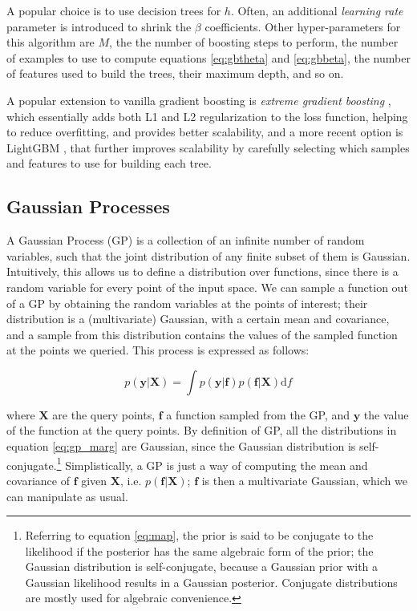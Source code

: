 \documentclass[a4paper,11pt]{kth-mag}
\begin{document}
A popular choice is to use decision trees for $h$. Often, an additional \emph{learning rate} parameter is introduced to shrink the $\beta$ coefficients. Other hyper-parameters for this algorithm are $M$, the the number of boosting steps to perform, the number of examples to use to compute equations \ref{eq:gbtheta} and \ref{eq:gbbeta}, the number of features used to build the trees, their maximum depth, and so on.

A popular extension to vanilla gradient boosting is \emph{extreme gradient boosting} \citep{xgboost}, which essentially adds both L1 and L2 regularization to the loss function, helping to reduce overfitting, and provides better scalability, and a more recent option is LightGBM \citep{lightgbm}, that further improves scalability by carefully selecting which samples and features to use for building each tree.

\subsection{Gaussian Processes}
A Gaussian Process (GP) is a collection of an infinite number of random variables, such that the joint distribution of any finite subset of them is Gaussian. Intuitively, this allows us to define a distribution over functions, since there is a random variable for every point of the input space. We can sample a function out of a GP by obtaining the random variables at the points of interest; their distribution is a (multivariate) Gaussian, with a certain mean and covariance, and a sample from this distribution contains the values of the sampled function at the points we queried. This process is expressed as follows:

\begin{equation}
\label{eq:gp_marg}
p(\bm y\vert\bm X)=\int p(\bm y\vert \bm f)p(\bm f\vert\bm X)\text{d}f
\end{equation}

\noindent where $\bm X$ are the query points, $\bm f$ a function sampled from the GP, and $\bm y$ the value of the function at the query points. By definition of GP, all the distributions in equation \ref{eq:gp_marg} are Gaussian, since the Gaussian distribution is self-conjugate.\footnote{Referring to equation \ref{eq:map}, the prior is said to be conjugate to the likelihood if the posterior has the same algebraic form of the prior; the Gaussian distribution is self-conjugate, because a Gaussian prior with a Gaussian likelihood results in a Gaussian posterior. Conjugate distributions are mostly used for algebraic convenience.} Simplistically, a GP is just a way of computing the mean and covariance of $\bm f$ given $\bm X$, i.e. $p(\bm f\vert\bm X)$; $\bm f$ is then a multivariate Gaussian, which we can manipulate as usual.
\end{document}
